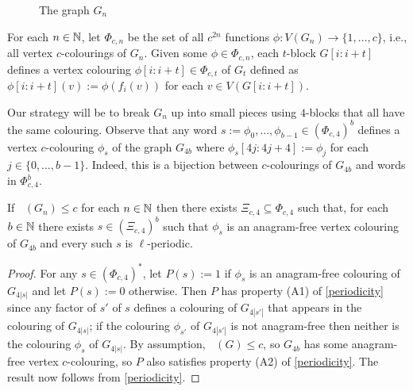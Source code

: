 \documentclass{patmorin}
\DeclareMathOperator{\afcn}{\dot{\chi}_\pi}
\begin{document}
\begin{figure}
    \caption{The graph $G_n$}
    \label{g_n}
\end{figure}

For each $n\in\mathbb{N}$, let $\Phi_{c,n}$ be the set of all $c^{2n}$ functions $\phi:V(G_n)\to\{1,\ldots,c\}$, i.e., all vertex $c$-colourings of $G_n$.
Given some $\phi\in\Phi_{c,n}$, each $t$-block $G[i\mathbin{:}i+t]$ defines a vertex colouring $\phi[i\mathbin{:}i+t]\in \Phi_{c,t}$ of $G_t$ defined as $\phi[i\mathbin{:}i+t](v):=\phi(f_i(v))$ for each $v\in V(G[i\mathbin{:}i+t])$.

Our strategy will be to break $G_n$ up into small pieces using $4$-blocks that all have the same colouring. Observe that any word $s:=\phi_0,\ldots,\phi_{b-1}\in(\Phi_{c,4})^b$ defines a vertex $c$-colouring $\phi_s$ of the graph $G_{4b}$ where $\phi_s[4j\mathbin{:}4j+4]:=\phi_j$ for each $j\in\{0,\ldots,b-1\}$.  Indeed, this is a bijection between $c$-colourings of $G_{4b}$ and words in $\Phi_{c,4}^b$.

\begin{lem}\label{breakers}
    If $\afcn(G_n)\le c$ for each $n\in\mathbb{N}$ then there exists $\Xi_{c,4}\subseteq\Phi_{c,4}$ such that, for each $b\in\mathbb{N}$ there exists $s\in(\Xi_{c,4})^b$ such that $\phi_s$ is an anagram-free vertex colouring of $G_{4b}$ and every such $s$ is $\ell$-periodic.
\end{lem}

\begin{proof}
    For any $s\in(\Phi_{c,4})^*$, let $P(s):=1$ if $\phi_s$ is an anagram-free colouring of $G_{4|s|}$ and let $P(s):=0$ otherwise.  Then $P$ has property (A1) of \cref{periodicity} since any factor of $s'$ of $s$ defines a colouring of $G_{4|s'|}$ that appears in the colouring of $G_{4|s|}$; if the colouring $\phi_{s'}$ of $G_{4|s'|}$ is not anagram-free then neither is the colouring $\phi_s$ of $G_{4|s|}$. By assumption, $\afcn(G)\le c$, so $G_{4b}$ has some anagram-free vertex $c$-colouring, so $P$ also satisfies property (A2) of \cref{periodicity}.  The result now follows from  \cref{periodicity}.
\end{proof}
\end{document}
